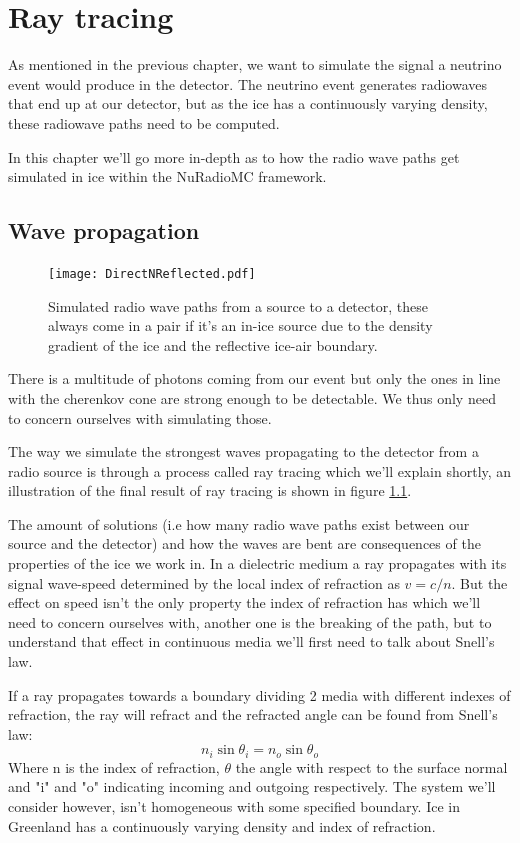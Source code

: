\chapter{Ray tracing}
\label{chap:RT}
As mentioned in the previous chapter, we want to simulate the signal a neutrino event
would produce in the detector. The neutrino event generates radiowaves that end
up at our detector, but as the ice has a continuously varying density, these radiowave
paths need to be computed.

In this chapter we'll go more in-depth as to how the radio wave paths get
simulated in ice within the NuRadioMC framework.
\section{Wave propagation}
\label{sec:WaveProp}
\begin{figure}[h!]
	\centering
	\texttt{[image: DirectNReflected.pdf]}
	\label{fig:PathIllu}
	\caption{Simulated radio wave paths from a source to a detector, these always come in a pair 
	if it's an in-ice source due to the density gradient of the ice and the reflective ice-air boundary.}
\end{figure}
There is a multitude of photons coming from our event but only the ones
in line with the cherenkov cone are strong enough to be detectable.
We thus only need to concern ourselves with simulating those.

The way we simulate the strongest waves propagating to the detector from a
radio source is through a process called ray tracing which we'll explain shortly, 
an illustration of the final result of ray tracing is shown in figure \ref{fig:PathIllu}.  

The amount of solutions (i.e how many radio wave paths exist between our source and the detector)
and how the waves are bent are consequences of the
properties of the ice we work in.  In a dielectric medium a ray propagates with
its signal wave-speed determined by the local index of refraction as $v =
c/n$. But the effect on speed isn't the only property the index of refraction has
which we'll need to concern ourselves with, another one is the breaking of the path,
but to understand that effect in continuous media we'll first need to talk about Snell's law. 

If a ray propagates towards a boundary dividing 2 media with different indexes
of refraction, the ray will refract and the refracted angle can be found from
Snell's law:
\begin{equation}
	n_i\sin{\theta_i} = n_o\sin{\theta_o}
\end{equation}
Where n is the index of refraction, $\theta$ the angle with respect to the
surface normal and "i" and "o" indicating incoming and outgoing respectively.
The system we'll consider however, isn't homogeneous with some specified
boundary. Ice in Greenland has a continuously varying density and
index of refraction.

